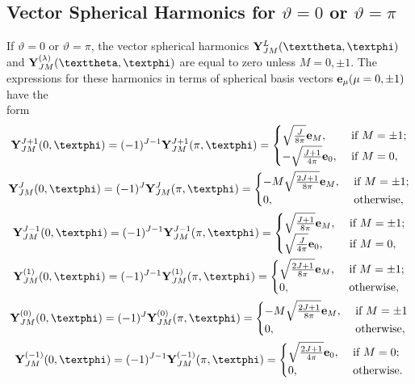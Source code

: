 \subsection{Vector Spherical Harmonics for $\vartheta=0$ or $\vartheta=\pi$}\label{sec:7.3.15}
If $\vartheta=0$ or $\vartheta=\pi$, the vector spherical harmonics $\vect{Y}_{J M}^{L}(\vartheta, \varphi)$ and $\vect{Y}_{J M}^{(\lambda)}(\vartheta, \varphi)$ are equal to zero unless $M=0, \pm 1$. The expressions for these harmonics in terms of spherical basis vectors $\mathbf{e}_{\mu}(\mu=0, \pm 1)$ have the\\
form
\begin{gather}
\vect{Y}_{J M}^{J+1}(0, \varphi)=(-1)^{J-1} \vect{Y}_{J M}^{J+1}(\pi, \varphi)= \begin{cases}\sqrt{\frac{J}{8 \pi}} \vect{e}_{M}, & \text { if } M= \pm 1 ; \\
-\sqrt{\frac{J+1}{4 \pi}} \vect{e}_{0}, & \text { if } M=0,\end{cases} \label{eq:7:3:140}\\
\vect{Y}_{J M}^{J}(0, \varphi)=(-1)^{J} \vect{Y}_{J M}^{J}(\pi, \varphi)= \begin{cases}-M \sqrt{\frac{2 J+1}{8 \pi}} \vect{e}_{M}, & \text { if } M= \pm 1 ; \\
0, & \text { otherwise},\end{cases}  \label{eq:7:3:141}\\
\vect{Y}_{J M}^{J-1}(0, \varphi)=(-1)^{J-1} \vect{Y}_{J M}^{J-1}(\pi, \varphi)= \begin{cases}\sqrt{\frac{J+1}{8 \pi}} \vect{e}_{M}, & \text { if } M= \pm 1 ; \\
\sqrt{\frac{J}{4 \pi}} \vect{e}_{0}, & \text { if } M=0,\end{cases} \label{eq:7:3:142}\\
\vect{Y}_{J M}^{(1)}(0, \varphi)=(-1)^{J-1} \vect{Y}_{J M}^{(1)}(\pi, \varphi)= \begin{cases}\sqrt{\frac{2 J+1}{8 \pi}} \vect{e}_{M}, & \text { if } M= \pm 1 ; \\
0, & \text { otherwise},\end{cases} \label{eq:7:3:143}\\
\vect{Y}_{J M}^{(0)}(0, \varphi)=(-1)^{J} \vect{Y}_{J M}^{(0)}(\pi, \varphi)= \begin{cases}-M \sqrt{\frac{2 J+1}{8 \pi}} \vect{e}_{M}, & \text { if } M= \pm 1 \\
0, & \text { otherwise},\end{cases}  \label{eq:7:3:144}\\
\vect{Y}_{J M}^{(-1)}(0, \varphi)=(-1)^{J-1} \vect{Y}_{J M}^{(-1)}(\pi, \varphi)= \begin{cases}\sqrt{\frac{2 J+1}{4 \pi}} \vect{e}_{0}, & \text { if } M=0 ; \\
0, & \text { otherwise}.\end{cases}  \label{eq:7:3:145}
\end{gather}
